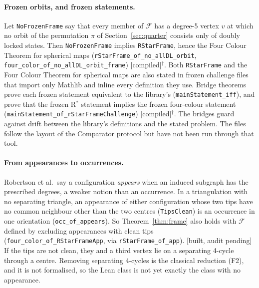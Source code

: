 \documentclass[11pt]{article}
\newcommand{\lab}[1]{\textsf{[#1]}}
\begin{document}
\paragraph{Frozen orbits, and frozen statements.} Let \texttt{NoFrozenFrame} say that every member of $\mathcal F$ has a degree-5 vertex $v$ at which no orbit of the permutation $\pi$ of Section~\ref{sec:quarter} consists only of doubly locked states. Then \texttt{NoFrozenFrame} implies \texttt{RStarFrame}, hence the Four Colour Theorem for spherical maps (\texttt{rStarFrame\_of\_no\_allDL\_orbit}, \texttt{four\_color\_of\_no\_allDL\_orbit\_frame}) \lab{compiled}$^\dagger$. Both \texttt{RStarFrame} and the Four Colour Theorem for spherical maps are also stated in frozen challenge files that import only Mathlib and inline every definition they use. Bridge theorems prove each frozen statement equivalent to the library's (\texttt{mainStatement\_iff}), and prove that the frozen R$^\ast$ statement implies the frozen four-colour statement (\texttt{mainStatement\_of\_rStarFrameChallenge}) \lab{compiled}$^\dagger$. The bridges guard against drift between the library's definitions and the stated problem. The files follow the layout of the Comparator protocol but have not been run through that tool.

\paragraph{From appearances to occurrences.} Robertson et al.\ say a configuration \emph{appears} when an induced subgraph has the prescribed degrees, a weaker notion than an occurrence. In a triangulation with no separating triangle, an appearance of either configuration whose two tips have no common neighbour other than the two centres (\texttt{TipsClean}) is an occurrence in one orientation (\texttt{occ\_of\_appears}). So Theorem~\ref{thm:frame} also holds with $\mathcal F$ defined by excluding appearances with clean tips (\texttt{four\_color\_of\_RStarFrameApp}, via \texttt{rStarFrame\_of\_app}). \lab{built, audit pending} If the tips are not clean, they and a third vertex lie on a separating 4-cycle through a centre. Removing separating 4-cycles is the classical reduction (F2), and it is not formalised, so the Lean class is not yet exactly the class with no appearance.
\end{document}
